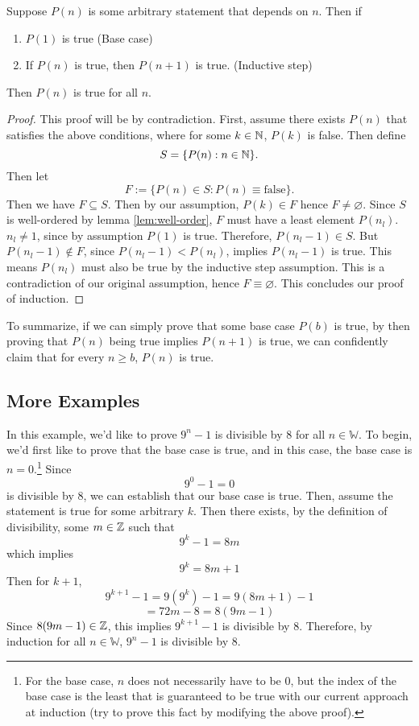 \begin{theorem}[Induction]
	Suppose $P(n)$ is some arbitrary statement that depends on $n$. Then if
	\begin{enumerate}
		\item $P(1)$ is true (Base case)
		\item If $P(n)$ is true, then $P(n+1)$ is true. (Inductive step)
	\end{enumerate}
	Then $P(n)$ is true for all $n$.
\end{theorem}
\begin{proof}
	This proof will be by contradiction. First, assume there exists $P(n)$ that satisfies the above conditions, where for some $k\in\mathbb{N}$, $P(k)$ is false. 
	Then define 
	$$S=\{P(n):n\in\mathbb{N}\}.$$
	Then let
	$$F:=\{P(n)\in S: P(n)\equiv \text{false}\}.$$
	Then we have $F\subseteq S$.
	Then by our assumption, $P(k)\in F$ hence $F\neq \varnothing$.
	Since $S$ is well-ordered by lemma \eqref{lem:well-order}, $F$ must have a least element $P(n_l)$. 
	$n_l\neq 1$, since by assumption $P(1)$ is true.
	Therefore, $P(n_l-1)\in S$. 
	But $P(n_l-1)\notin F$, since $P(n_l-1)<P(n_l)$, implies $P(n_l-1)$ is true.
	This means $P(n_l)$ must also be true by the inductive step assumption.
	This is a contradiction of our original assumption, hence $F\equiv \varnothing$. 
	This concludes our proof of induction.
\end{proof}

To summarize, if we can simply prove that some base case $P(b)$ is true, by then proving that $P(n)$ being true implies $P(n+1)$ is true, we can confidently claim that for every $n\ge b$, $P(n)$ is true.
\subsection{More Examples}
\begin{ex}
	In this example, we'd like to prove $9^n-1$ is divisible by $8$ for all $n\in\mathbb{W}$. 
	To begin, we'd first like to prove that the base case is true, and in this case, the base case is $n=0$.\footnote{For the base case, $n$ does not necessarily have to be 0, but the index of the base case is the least that is guaranteed to be true with our current approach at induction (try to prove this fact by modifying the above proof).} Since
	$$9^0-1=0$$
	is divisible by 8, we can establish that our base case is true. Then, assume the statement is true for some arbitrary $k$. Then there exists, by the definition of divisibility, some $m\in\mathbb{Z}$ such that
	$$9^k-1=8m$$
	which implies
	$$9^k=8m+1$$
	Then for $k+1$,
	$$9^{k+1}-1=9(9^k)-1=9(8m+1)-1$$
	$$=72m-8=8(9m-1)$$
	Since $8(9m-1)\in\mathbb{Z}$, this implies $9^{k+1}-1$ is divisible by 8. Therefore, by induction for all $n\in\mathbb{W}$, $9^n-1$ is divisible by 8.
\end{ex}

